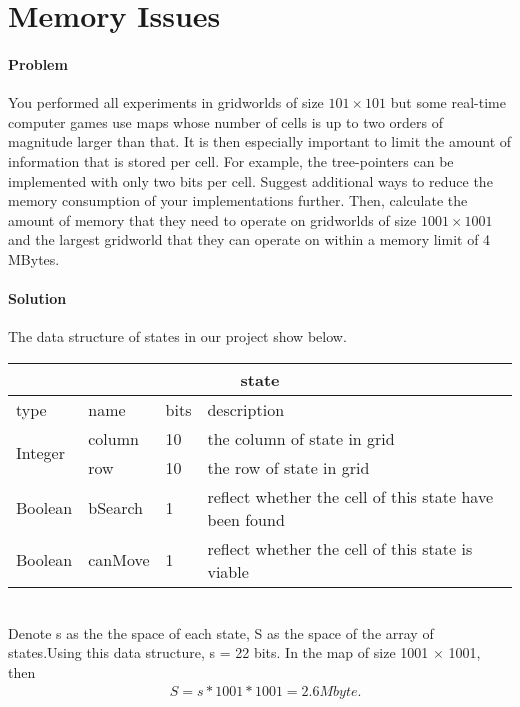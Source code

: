 \section{Memory Issues}

\paragraph{Problem}
You performed all experiments in gridworlds of size $101\times 101$ but some
real-time computer games use maps whose number of cells is up to two orders of
magnitude larger than that. It is then especially important to limit the amount
of information that is stored per cell. For example, the tree-pointers can be
implemented with only two bits per cell. Suggest additional ways to reduce the
memory consumption of your implementations further. Then, calculate the amount
of memory that they need to operate on gridworlds of size $1001\times 1001$ and
the largest gridworld that they can operate on within a memory limit of 4
MBytes.

\paragraph{Solution}
The data structure of states in our project show below.

\begin{tabular}{|l|l|l|l|}
\hline
\multicolumn{4}{|c|}{state}\\
\hline
type&name&bits&description\\
\hline
\multirow{2}{*}{Integer}
&column&10&the column of state in grid\\
&row&10&the row of state in grid\\
\hline
Boolean&bSearch&1&reflect whether the cell of this state have been found\\
\hline
Boolean&canMove&1&reflect whether the cell of this state is viable\\
\hline
\end{tabular}\\

Denote s as the the space of each state, S as the space of the array of states.Using this data structure, s = 22 bits. In the map of size 1001 $\times$ 1001, then
\begin{equation*}
  \begin{aligned}
   &S = s * 1001 * 1001 = 2.6 Mbyte.
  \end{aligned}
\end{equation*}

